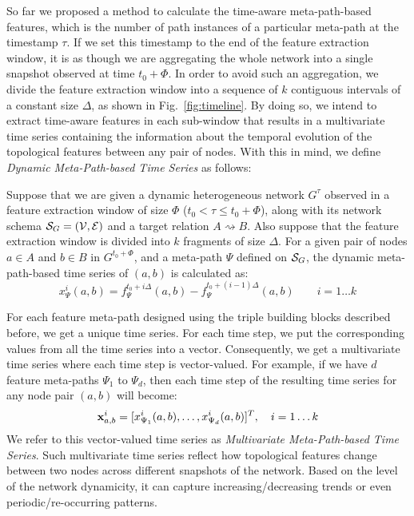 So far we proposed a method to calculate the time-aware meta-path-based features, which is the number of path instances of a particular meta-path at the timestamp $\tau$. If we set this timestamp to the end of the feature extraction window, it is as though we are aggregating the whole network into a single snapshot observed at time $t_0+\Phi$. In order to avoid such an aggregation, we divide the feature extraction window into a sequence of $k$ contiguous intervals of a constant size $\Delta$, as shown in Fig.~\ref{fig:timeline}. By doing so, we intend to extract time-aware features in each sub-window that results in a multivariate time series containing the information about the temporal evolution of the topological features between any pair of nodes. With this in mind, we define \emph{Dynamic Meta-Path-based Time Series} as follows:

\begin{definition}
    Suppose that we are given a dynamic heterogeneous network $G^{\tau}$ observed in a feature extraction window of size $\Phi$ ($t_0<\tau \le t_0+\Phi$), along with its network schema $\mathcal{S}_G=(\mathcal{V}, \mathcal{E})$ and a target relation $A\rightsquigarrow B$. Also suppose that the feature extraction window is divided into $k$ fragments of size $\Delta$. For a given pair of nodes $a\in A$ and $b\in B$ in $G^{t_0+\Phi}$, and a meta-path $\Psi$ defined on $\mathcal{S}_G$, the dynamic meta-path-based time series of $(a,b)$ is calculated as:
    \begin{equation*}
        x_{\Psi}^i(a,b)=f_{\Psi}^{t_0+i\Delta}(a,b) - f_{\Psi}^{t_0+(i-1)\Delta}(a,b)\quad\quad i=1\dots k
    \end{equation*}
\end{definition}

For each feature meta-path designed using the triple building blocks described before, we get a unique time series. For each time step, we put the corresponding values from all the time series into a vector. Consequently, we get a multivariate time series where each time step is vector-valued. For example, if we have $d$ feature meta-paths $\Psi_1$ to $\Psi_d$, then each time step of the resulting time series for any node pair $(a,b)$ will become:
\[\mathbf{x}^i_{a,b}=[x_{\Psi_1}^i(a,b),\dots,x_{\Psi_d}^i(a,b)]^T,\quad i=1\dots k\]
We refer to this vector-valued time series as \emph{Multivariate Meta-Path-based Time Series}. Such multivariate time series reflect how topological features change between two nodes across different snapshots of the network. Based on the level of the network dynamicity, it can capture increasing/decreasing trends or even periodic/re-occurring patterns.

